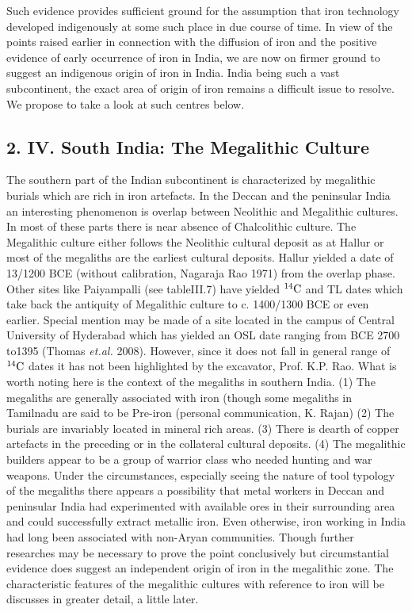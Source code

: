 Such evidence provides sufficient ground for the assumption that iron technology developed indigenously at some such place in due course of time. In view of the points raised earlier in connection with the diffusion of iron and the positive evidence of early occurrence of iron in India, we are now on firmer ground to suggest an indigenous origin of iron in India. India being such a vast subcontinent, the exact area of origin of iron remains a difficult issue to resolve. We propose to take a look at such centres below.

\vspace{-.3cm}

\subsection*{2. IV. South India: The Megalithic Culture}\label{subsection-7}

\vspace{-.2cm}

The southern part of the Indian subcontinent is characterized by megalithic burials which are rich in iron artefacts. In the Deccan and the peninsular India an interesting phenomenon is overlap between Neolithic and Megalithic cultures. In most of these parts there is near absence of Chalcolithic culture. The Megalithic culture either follows the Neolithic cultural deposit as at Hallur or most of the megaliths are the earliest cultural deposits. Hallur yielded a date of 13/1200 BCE (without calibration, Nagaraja Rao 1971) from the overlap phase. Other sites like Paiyampalli (see tableIII.7) have yielded $^{14}{\rm C}$ and TL dates which take back the antiquity of Megalithic culture to c. 1400/1300 BCE or even earlier. Special mention may be made of a site located in the campus of Central University of Hyderabad which has yielded an OSL date ranging from BCE 2700 to1395 (Thomas \textit{et.al.} 2008). However, since it does not fall in general range of $^{14}{\rm C}$ dates it has not been highlighted by the excavator, Prof. K.P. Rao. What is worth noting here is the context of the megaliths in southern India. (1) The megaliths are generally associated with iron (though some megaliths in Tamilnadu are said to be Pre-iron (personal communication, K. Rajan) (2) The burials are invariably located in mineral rich areas. (3) There is dearth of copper artefacts in the preceding or in the collateral cultural deposits. (4) The megalithic builders appear to be a group of warrior class who needed hunting and war weapons. Under the circumstances, especially seeing the nature of tool typology of the megaliths there appears a possibility that metal workers in Deccan and peninsular India had experimented with available ores in their surrounding area and could successfully extract metallic iron. Even otherwise, iron working in India had long been associated with non-Aryan communities. Though further researches may be necessary to prove the point conclusively but circumstantial evidence does suggest an independent origin of iron in the megalithic zone. The characteristic features of the megalithic cultures with reference to iron will be discusses in greater detail, a little later.

